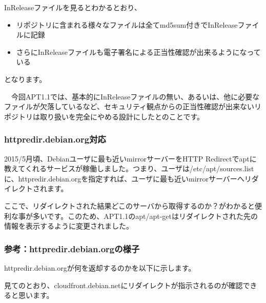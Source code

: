 \documentclass[mingoth,a4paper]{jsarticle}
\begin{document}
InReleaseファイルを見るとわかるとおり、

\begin{itemize}
\item リポジトリに含まれる様々なファイルは全てmd5sum付きでInReleaseファイルに記録
\item さらにInReleaseファイルも電子署名による正当性確認が出来るようになっている
\end{itemize}

となります。

　今回APT1.1では、基本的にInReleaseファイルの無い、あるいは、他に必要なファイルが欠落しているなど、セキュリティ観点からの正当性確認が出来ないリポジトリは取り扱いを完全にやめる設計にしたとのことです。

\subsubsection{httpredir.debian.org対応}

 2015/5月頃、Debianユーザに最も近いmirrorサーバーをHTTP Redirectでaptに教えてくれるサービスが稼働しました。つまり、ユーザは/etc/apt/sources.listに、httpredir.debian.orgを指定すれば、ユーザに最も近いmirrorサーバーへリダイレクトされます。

 ここで、リダイレクトされた結果どこのサーバから取得するのか？がわかると便利な事が多いです。このため、APT1.1のapt/apt-getはリダイレクトされた先の情報を表示するように変更されました。

\subsubsection{参考：httpredir.debian.orgの様子}

 httpredir.debian.orgが何を返却するのかを以下に示します。


 見てのとおり、cloudfront.debian.netにリダイレクトが指示されるのが確認できると思います。
\end{document}
